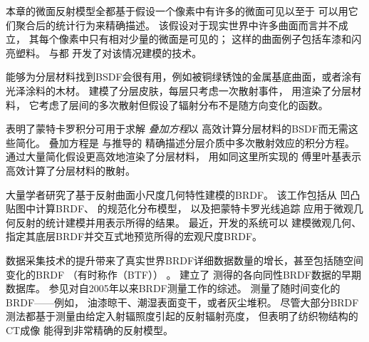 本章的微面反射模型全都基于假设一个像素中有许多的微面可见以至于
可以用它们聚合后的统计行为来精确描述。
该假设对于现实世界中许多曲面而言并不成立，
其每个像素中只有相对少量的微面是可见的；
这样的曲面例子包括车漆和闪亮塑料。
\citet{10.1145/2601097.2601155}与\citet{10.1145/2601097.2601186}都
开发了对该情况建模的技术。

能够为分层材料找到BSDF会很有用，例如被铜绿锈蚀的金属基底曲面，或者涂有光泽涂料的木材。
\citet{10.1145/166117.166139}建模了分层皮肤，每层只考虑一次散射事件，
\citet{10.1145/237170.237278}用渲染了分层材料，
它考虑了层间的多次散射但假设了辐射分布不是随方向变化的函数。

\citet{10.1145/344779.344824}表明了蒙特卡罗积分可用于求解
\emph{叠加方程}以
高效计算分层材料的BSDF而无需这些简化。
叠加方程是\citet{10.1016/B978-0-12-710701-1.50002-1}
与\citet{MatrixMethodsforMultipleScatteringProblems}推导的
精确描述分层介质中多次散射效应的积分方程。
\citet{10.1145/1321261.1321292}通过大量简化假设更高效地渲染了分层材料，
\citet{10.1145/2601097.2601139}用如同这里所实现的
傅里叶基表示高效计算了分层材料的散射。

大量学者研究了基于反射曲面小尺度几何特性建模的BRDF。
该工作包括\citet{10.1145/37401.37434}从
凹凸贴图中计算BRDF、
\citet{fournier1992normal}的规范化分布模型，
以及\citet{10.1145/133994.134075}把蒙特卡罗光线追踪
应用于微观几何反射的统计建模并用表示所得的结果。
最近，\citet{10.1145/2070781.2024179}开发的系统可以
建模微观几何、指定其底层BRDF并交互式地预览所得的宏观尺度BRDF。

数据采集技术的提升带来了真实世界BRDF详细数据数量的增长，甚至包括随空间变化的BRDF
（有时称作（BTF））
\citep{10.1145/300776.300778}。
\citet{10.5555/882404.882439,10.1145/882262.882343}建立了
测得的各向同性BRDF数据的早期数据库。
参见\citet{10.1111/j.1467-8659.2005.00830.x}对自2005年以来BRDF测量工作的综述。
\citet{10720740}测量了随时间变化的BRDF——例如，
油漆晾干、潮湿表面变干，或者灰尘堆积。
尽管大部分BRDF测法都基于测量由给定入射辐照度引起的反射辐射亮度，
但\citet{10.1145/2010324.1964939}表明了纺织物结构的CT成像
能得到非常精确的反射模型。
